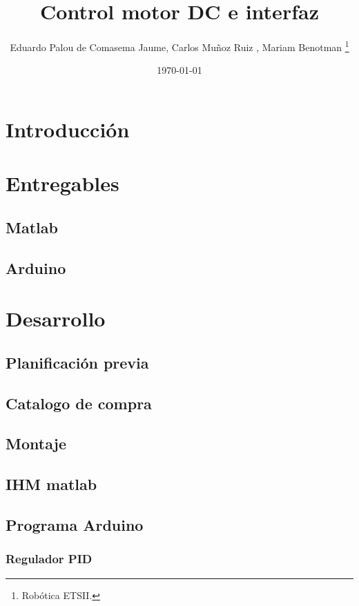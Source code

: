 \documentclass[a4paper]{article}
\title{Control motor DC e interfaz}
\author{Eduardo Palou de Comasema Jaume, Carlos Muñoz Ruiz , Mariam Benotman \thanks{Robótica ETSII.}}
\date{\today}
\begin{document}
	\maketitle
	\tableofcontents
	
	\section{Introducción}\label{sec:Intro}
		
	\section{Entregables}\label{sec:Entre}
		\subsection{Matlab}\label{sec:Matlab}
			\lipsum[1]
		\subsection{Arduino}\label{sec:Arduino}
			\lipsum[1]
	\section{Desarrollo}\label{sec:Desa}
		\lipsum[1]
		\subsection{Planificación previa}\label{sec:Planificación}
			\lipsum[2]
		\subsection{Catalogo de compra}\label{sec:Compra}
			\lipsum[1]
		\subsection{Montaje}\label{sec:Montaje}
			\lipsum[1]
		\subsection{IHM matlab}\label{sec:IHM}
			\lipsum[1]
		\subsection{Programa Arduino}\label{sec:Programa}
			\subsubsection{Regulador PID}\label{sec:RPID}
				\lipsum[1][10]
\end{document}
